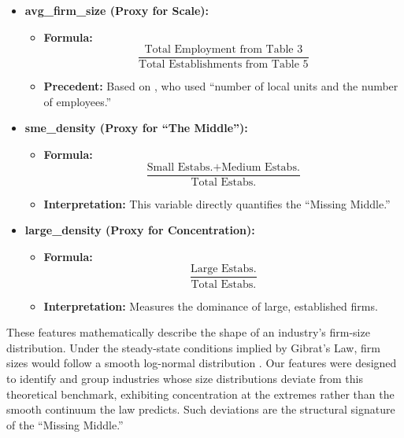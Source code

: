 \documentclass[acmtog, nonacm]{acmart}
\begin{document}
\begin{itemize}
    \item \textbf{avg\_firm\_size (Proxy for Scale):}
    \begin{itemize}
        \item \textbf{Formula:} 
        \begin{equation}
             \frac{\text{Total Employment from Table 3}}{\text{Total Establishments from Table 5}}
        \end{equation}
        \item \textbf{Precedent:} Based on \citet{karaca2018}, who used ``number of local units and the number of employees.''
    \end{itemize}

    \item \textbf{sme\_density (Proxy for ``The Middle''):}
    \begin{itemize}
        \item \textbf{Formula:} 
        \begin{equation}
            \frac{\text{Small Estabs.} + \text{Medium Estabs.}}{\text{Total Estabs.}}
        \end{equation}
        \item \textbf{Interpretation:} This variable directly quantifies the ``Missing Middle.''
    \end{itemize}
    
    \item \textbf{large\_density (Proxy for Concentration):}
    \begin{itemize}
        \item \textbf{Formula:} 
        \begin{equation}
            \frac{\text{Large Estabs.}}{\text{Total Estabs.}}
        \end{equation}
        \item \textbf{Interpretation:} Measures the dominance of large, established firms.
    \end{itemize}
\end{itemize}

These features mathematically describe the shape of an industry's firm-size distribution. Under the steady-state conditions implied by Gibrat's Law, firm sizes would follow a smooth log-normal distribution \citep{sutton1997}. Our features were designed to identify and group industries whose size distributions deviate from this theoretical benchmark, exhibiting concentration at the extremes rather than the smooth continuum the law predicts. Such deviations are the structural signature of the ``Missing Middle.''
\end{document}
